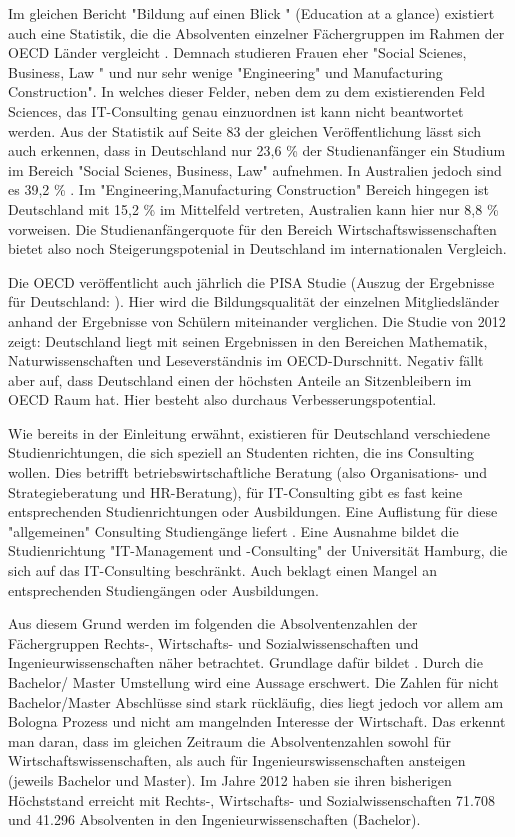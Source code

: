 Im gleichen Bericht "Bildung auf einen Blick " (Education at a glance) existiert auch eine Statistik, die die Absolventen einzelner Fächergruppen im Rahmen der OECD Länder vergleicht \cite{oecd3}. Demnach studieren Frauen eher "Social Scienes, Business, Law " und nur sehr wenige "Engineering" und Manufacturing Construction". In welches dieser Felder, neben dem  zu dem existierenden Feld Sciences, das IT-Consulting genau einzuordnen ist kann nicht beantwortet werden. Aus der Statistik auf Seite 83 der gleichen Veröffentlichung lässt sich auch erkennen, dass in Deutschland nur 23,6 \% der Studienanfänger ein Studium im Bereich "Social Scienes, Business, Law" aufnehmen. In Australien jedoch sind es 39,2 \% . Im "Engineering,Manufacturing Construction" Bereich hingegen ist Deutschland mit 15,2 \% im Mittelfeld vertreten, Australien kann hier nur  8,8 \% vorweisen. Die Studienanfängerquote für den Bereich Wirtschaftswissenschaften bietet also noch Steigerungspotenial in Deutschland im internationalen Vergleich.

Die OECD veröffentlicht auch jährlich die PISA Studie (Auszug der Ergebnisse für Deutschland: \cite{pisa} ). Hier wird die Bildungsqualität der einzelnen Mitgliedsländer anhand der Ergebnisse von Schülern miteinander verglichen. Die Studie von 2012 zeigt: Deutschland liegt mit seinen Ergebnissen in den Bereichen Mathematik, Naturwissenschaften und Leseverständnis im OECD-Durschnitt. Negativ fällt aber auf, dass Deutschland einen der höchsten Anteile an Sitzenbleibern im OECD Raum hat. Hier besteht also durchaus Verbesserungspotential.

Wie bereits in der Einleitung erwähnt, existieren für Deutschland verschiedene Studienrichtungen, die sich speziell an Studenten richten, die ins Consulting wollen. Dies betrifft betriebswirtschaftliche Beratung (also Organisations- und Strategieberatung und HR-Beratung), für IT-Consulting gibt es fast keine entsprechenden Studienrichtungen oder Ausbildungen.
Eine Auflistung für diese "allgemeinen" Consulting Studiengänge liefert \cite{NissenKlaukDeelmannMohe201209}. 
Eine Ausnahme bildet die Studienrichtung "IT-Management und -Consulting" der Universität Hamburg, die sich auf das IT-Consulting beschränkt. Auch \cite{IDSScheer} beklagt einen Mangel an entsprechenden Studiengängen oder Ausbildungen.

Aus diesem Grund werden im folgenden die Absolventenzahlen der Fächergruppen Rechts-, Wirtschafts- und Sozialwissenschaften und Ingenieurwissenschaften näher betrachtet.
Grundlage dafür bildet \cite{absolventen} . Durch die Bachelor/ Master Umstellung wird eine Aussage erschwert. Die Zahlen für nicht Bachelor/Master Abschlüsse sind stark rückläufig, dies liegt jedoch vor allem am Bologna Prozess und nicht am mangelnden Interesse der Wirtschaft. Das erkennt man daran, dass im gleichen Zeitraum die Absolventenzahlen sowohl für Wirtschaftswissenschaften, als auch für Ingenieurswissenschaften ansteigen (jeweils Bachelor und Master). Im Jahre 2012 haben sie ihren bisherigen Höchststand erreicht mit Rechts-, Wirtschafts- und Sozialwissenschaften 71.708 und 41.296 Absolventen in den Ingenieurwissenschaften (Bachelor).

